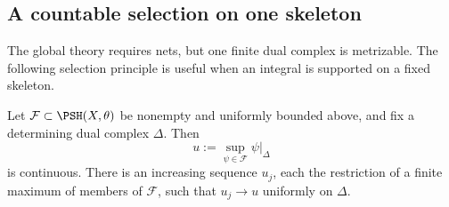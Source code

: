 \subsection{A countable selection on one skeleton}
\label{sec:ch23-fixed-skeleton-selection}

The global theory requires nets, but one finite dual complex is metrizable.
The following selection principle is useful when an integral is supported
on a fixed skeleton.

\begin{proposition}\label{prop:ch23-fixed-skeleton-selection}
Let \(\mathcal F\subset\PSH(X,\theta)\) be nonempty and uniformly bounded
above, and fix a determining dual complex \(\Delta\).  Then
\begin{equation}\label{eq:ch23-fixed-skeleton-sup}
                    u:=\sup_{\psi\in\mathcal F}\psi|_\Delta
\end{equation}
is continuous.  There is an increasing sequence \(u_j\), each the
restriction of a finite maximum of members of \(\mathcal F\), such that
\(u_j\to u\) uniformly on \(\Delta\).
\end{proposition}

